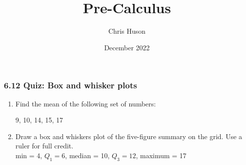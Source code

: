 \documentclass[12pt, twoside]{article}
\title{Pre-Calculus}
\author{Chris Huson}
\date{December 2022}
\begin{document}
\subsubsection*{6.12 Quiz: Box and whisker plots}
\begin{enumerate}
\item Find the mean of the following set of numbers:
  \begin{center}
    9, 10, 14, 15, 17
  \end{center} \vspace{2cm}
  
\item Draw a box and whiskers plot of the five-figure summary on the grid. Use a ruler for full credit. \vspace{0.25cm}\\
min = 4, $Q_1=6$, median = 10, $Q_3=12$, maximum = 17
  \begin{center}
  \end{center}


\end{enumerate}
\end{document}

